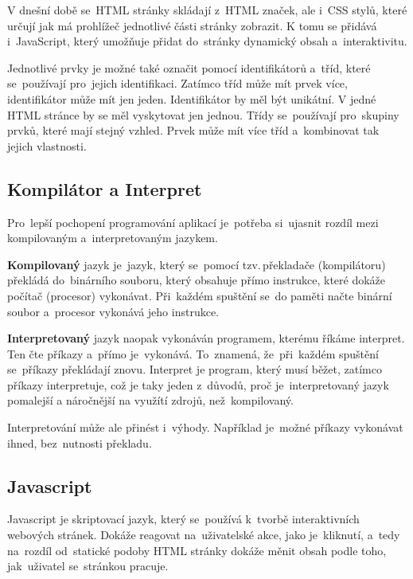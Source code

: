 \documentclass[14pt]{article}
\begin{document}
        V dnešní době se~HTML stránky skládají z~HTML značek, ale i~CSS stylů, které určují jak má prohlížeč jednotlivé části stránky zobrazit.
        K tomu se přidává i~JavaScript, který umožňuje přidat do~stránky dynamický obsah a~interaktivitu. \parencite{berners:1989:proposal}

        Jednotlivé prvky je možné také označit pomocí identifikátorů a~tříd, které se~používají pro~jejich identifikaci.
        Zatímco tříd může mít prvek více, identifikátor může mít jen jeden. Identifikátor by měl být unikátní. V jedné HTML stránce by se měl vyskytovat jen jednou.
        Třídy se~používají pro~skupiny prvků, které mají stejný vzhled. Prvek může mít více tříd a~kombinovat tak jejich vlastnosti. \parencite{jpw:tridy}

        \subsection{Kompilátor a Interpret}
        Pro~lepší pochopení programování aplikací je~potřeba si~ujasnit rozdíl mezi kompilovaným a~interpretovaným jazykem.

        \textbf{Kompilovaný} jazyk je~jazyk, který se~pomocí tzv.\,překladače (kompilátoru) překládá do~binárního souboru, který obsahuje přímo instrukce,
        které dokáže počítač (procesor) vykonávat. Při~každém spuštění se~do paměti načte binární soubor a~procesor vykonává jeho instrukce.

        \textbf{Interpretovaný} jazyk naopak vykonáván programem, kterému říkáme interpret. Ten čte příkazy a~přímo je~vykonává. To~znamená,
        že~při~každém spuštění se~příkazy překládají znovu. Interpret je program, který musí běžet, zatímco příkazy interpretuje,
        což je taky jeden z~důvodů, proč je~interpretovaný jazyk pomalejší a náročnější na využítí zdrojů, než~kompilovaný.
        
        Interpretování může ale přinést i~výhody. Například je~možné příkazy vykonávat ihned, bez~nutnosti překladu. \parencite{ueda:compiled}
        
        \subsection{Javascript}
        Javascript je skriptovací jazyk, který se~používá k~tvorbě interaktivních webových stránek. Dokáže reagovat na~uživatelské akce,
        jako je~kliknutí, a~tedy na~rozdíl od~statické podoby HTML stránky dokáže měnit obsah podle toho, jak~uživatel se~stránkou pracuje.
\end{document}
